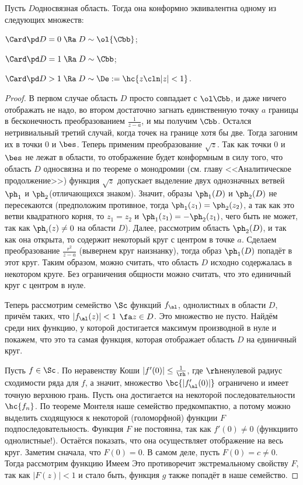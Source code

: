 \documentclass[a4paper]{article}
\begin{document}
\begin{theorem}
Пусть $D$\т односвязная область. Тогда она конформно эквивалентна одному из следующих множеств:
\begin{items}{-2}
\item $\Card \pd D = 0 \; \Ra \; D \sim \ol{\Cbb}$;
\item $\Card \pd D = 1 \; \Ra \; D \sim \Cbb$;
\item $\Card \pd D > 1 \; \Ra \; D \sim \De := \hc{z\cln |z|<1}$.
\end{items}
\end{theorem}
\begin{proof}
В первом случае область $D$ просто совпадает с $\ol\Cbb$, и даже ничего отображать не надо, во втором достаточно загнать
единственную точку $a$ границы в бесконечность преобразованием $\frac{1}{z-a}$, и мы получим $\Cbb$.
Остался нетривиальный третий случай, когда точек на границе хотя бы две. Тогда загоним их в точки $0$ и $\bes$.
Теперь применим преобразование $\sqrt{z}$. Так как точки $0$ и $\bes$ не лежат в области, то отображение будет конформным
в силу того, что область $D$ односвязна и по теореме о монодромии (см. главу <<Аналитическое продолжение>>) функция $\sqrt{z}$
допускает выделение двух однозначных ветвей $\ph_1$ и $\ph_2$(отличающихся знаком). Значит, образы $\ph_1(D)$ и $\ph_2(D)$
не пересекаются (предположим противное, тогда $\ph_1(z_1)=\ph_2(z_2)$, а так как это ветви квадратного корня, то
$z_1=z_2$ и $\ph_1(z_1) = -\ph_2(z_1)$, чего быть не может, так как $\ph_i(z)\neq 0$ на области $D$).
Далее, рассмотрим область $\ph_2(D)$, и так как она открыта, то содержит некоторый круг с центром в точке $a$.
Сделаем преобразование $\frac{r^2}{z-a}$ (вывернем круг наизнанку), тогда образ $\ph_1(D)$ попадёт в этот круг.
Таким образом, можно считать, что область $D$ исходно содержалась
в некотором круге. Без ограничения общности можно считать, что это единичный круг с центром в нуле.

Теперь рассмотрим семейство $\Sc$ функций $f_\al$, однолистных в области $D$, причём  таких, что $|f_\al(z)| < 1$ $\fa z \in D$. Это множество не пусто. Найдём среди них функцию, у которой достигается максимум производной в нуле и покажем, что это та самая функция, которая отображает область $D$ на единичный круг.

Пусть $f \in \Sc$. По неравенству Коши $|f'(0)| \le \frac{1}{\rh}$, где $\rh$\т ненулевой радиус
сходимости ряда для $f$, а значит, множество $\bc{|f_\al'(0)|}$ ограничено и имеет точную верхнюю грань. Пусть она достигается на некоторой последовательности $\hc{f_n}$. По теореме Монтеля наше семейство предкомпактно, а потому можно выделить сходящуюся к некоторой (голоморфной) функции $F$ подпоследовательность. Функция $F$ не постоянна, так как $f'(0)\neq 0$ (функции\д то однолистные!). Остаётся показать, что она осуществляет отображение на весь круг.
Заметим сначала, что $F(0)=0$. В самом деле, пусть $F(0)=c\neq 0$. Тогда рассмотрим функцию
Имеем
Это противоречит экстремальному свойству $F$, так как $|F(z)|< 1$ и стало быть, функция $g$ также попадёт в наше семейство.


\end{proof}
\end{document}
